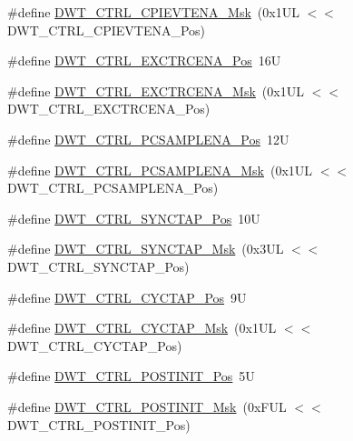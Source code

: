 \begin{DoxyCompactItemize}
\item 
\#define \hyperlink{group___c_m_s_i_s___d_w_t_ga189089c30aade60b983df17ad2412f6f}{D\+W\+T\+\_\+\+C\+T\+R\+L\+\_\+\+C\+P\+I\+E\+V\+T\+E\+N\+A\+\_\+\+Msk}~(0x1\+U\+L $<$$<$ D\+W\+T\+\_\+\+C\+T\+R\+L\+\_\+\+C\+P\+I\+E\+V\+T\+E\+N\+A\+\_\+\+Pos)
\item 
\#define \hyperlink{group___c_m_s_i_s___d_w_t_ga05f13b547a9a1e63e003ee0bc6446d0d}{D\+W\+T\+\_\+\+C\+T\+R\+L\+\_\+\+E\+X\+C\+T\+R\+C\+E\+N\+A\+\_\+\+Pos}~16U
\item 
\#define \hyperlink{group___c_m_s_i_s___d_w_t_gaf4fbb509ab3cbb768f16484c660a24c3}{D\+W\+T\+\_\+\+C\+T\+R\+L\+\_\+\+E\+X\+C\+T\+R\+C\+E\+N\+A\+\_\+\+Msk}~(0x1\+U\+L $<$$<$ D\+W\+T\+\_\+\+C\+T\+R\+L\+\_\+\+E\+X\+C\+T\+R\+C\+E\+N\+A\+\_\+\+Pos)
\item 
\#define \hyperlink{group___c_m_s_i_s___d_w_t_ga1e14afc7790fcb424fcf619e192554c9}{D\+W\+T\+\_\+\+C\+T\+R\+L\+\_\+\+P\+C\+S\+A\+M\+P\+L\+E\+N\+A\+\_\+\+Pos}~12U
\item 
\#define \hyperlink{group___c_m_s_i_s___d_w_t_gafdcf1c86f43fbeaf2780ce797c9ef3d6}{D\+W\+T\+\_\+\+C\+T\+R\+L\+\_\+\+P\+C\+S\+A\+M\+P\+L\+E\+N\+A\+\_\+\+Msk}~(0x1\+U\+L $<$$<$ D\+W\+T\+\_\+\+C\+T\+R\+L\+\_\+\+P\+C\+S\+A\+M\+P\+L\+E\+N\+A\+\_\+\+Pos)
\item 
\#define \hyperlink{group___c_m_s_i_s___d_w_t_ga678ef08786edcbef964479217efb9284}{D\+W\+T\+\_\+\+C\+T\+R\+L\+\_\+\+S\+Y\+N\+C\+T\+A\+P\+\_\+\+Pos}~10U
\item 
\#define \hyperlink{group___c_m_s_i_s___d_w_t_gaf1e6c3729d56ecadeb6eeff4d225968c}{D\+W\+T\+\_\+\+C\+T\+R\+L\+\_\+\+S\+Y\+N\+C\+T\+A\+P\+\_\+\+Msk}~(0x3\+U\+L $<$$<$ D\+W\+T\+\_\+\+C\+T\+R\+L\+\_\+\+S\+Y\+N\+C\+T\+A\+P\+\_\+\+Pos)
\item 
\#define \hyperlink{group___c_m_s_i_s___d_w_t_gaf70b80936c7db60bf84fb6dadb8a3559}{D\+W\+T\+\_\+\+C\+T\+R\+L\+\_\+\+C\+Y\+C\+T\+A\+P\+\_\+\+Pos}~9U
\item 
\#define \hyperlink{group___c_m_s_i_s___d_w_t_ga6c12e2868b8989a69445646698b8c331}{D\+W\+T\+\_\+\+C\+T\+R\+L\+\_\+\+C\+Y\+C\+T\+A\+P\+\_\+\+Msk}~(0x1\+U\+L $<$$<$ D\+W\+T\+\_\+\+C\+T\+R\+L\+\_\+\+C\+Y\+C\+T\+A\+P\+\_\+\+Pos)
\item 
\#define \hyperlink{group___c_m_s_i_s___d_w_t_ga2868c0b28eb13be930afb819f55f6f25}{D\+W\+T\+\_\+\+C\+T\+R\+L\+\_\+\+P\+O\+S\+T\+I\+N\+I\+T\+\_\+\+Pos}~5U
\item 
\#define \hyperlink{group___c_m_s_i_s___d_w_t_gab8cbbee1e1d94d09f9a1f86379a08ee8}{D\+W\+T\+\_\+\+C\+T\+R\+L\+\_\+\+P\+O\+S\+T\+I\+N\+I\+T\+\_\+\+Msk}~(0x\+F\+U\+L $<$$<$ D\+W\+T\+\_\+\+C\+T\+R\+L\+\_\+\+P\+O\+S\+T\+I\+N\+I\+T\+\_\+\+Pos)

\end{DoxyCompactItemize}

